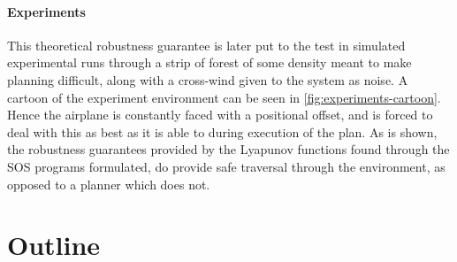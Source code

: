 \paragraph{Experiments}
This theoretical robustness guarantee is later put to the test in simulated
experimental runs through a strip of forest of some density meant to make
planning difficult, along with a cross-wind given to the system as noise. A
cartoon of the experiment environment can be seen in
\cref{fig:experiments-cartoon}. Hence the airplane is constantly faced with a
positional offset, and is forced to deal with this as best as it is able to
during execution of the plan. As is shown, the robustness guarantees provided by
the Lyapunov functions found through the \ac{SOS} programs formulated, do
provide safe traversal through the environment, as opposed to a planner which
does not.

\section{Outline}

